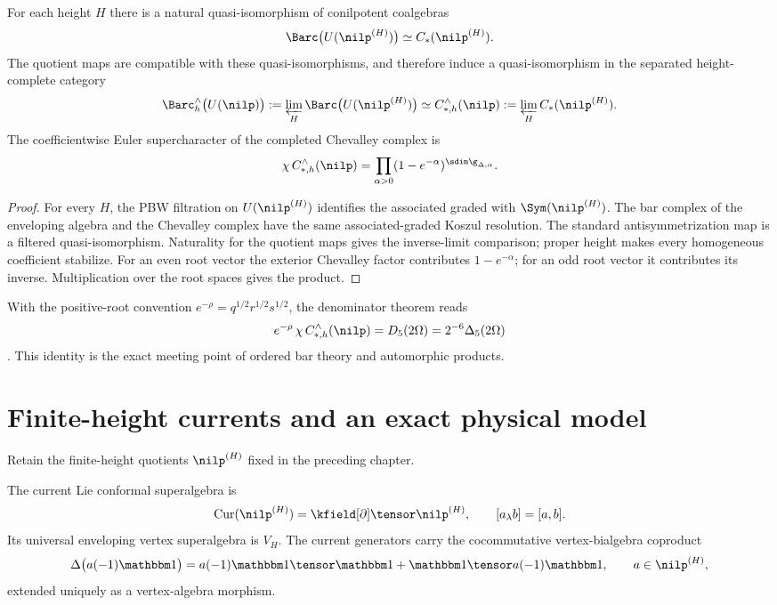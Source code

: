 \begin{theorem}
For each height $H$ there is a natural quasi-isomorphism of conilpotent coalgebras
\[
 \Barc\bigl(U(\nilp^{(H)})\bigr)\simeq C_*(\nilp^{(H)}).
\]
The quotient maps are compatible with these quasi-isomorphisms, and therefore induce a quasi-isomorphism in the separated height-complete category
\[
 \Barc_h^\wedge\bigl(U(\nilp)\bigr):=\varprojlim_H\Barc\bigl(U(\nilp^{(H)})\bigr)
 \simeq
 C_{*,h}^\wedge(\nilp):=\varprojlim_H C_*(\nilp^{(H)}).
\]
The coefficientwise Euler supercharacter of the completed Chevalley complex is
\[
 \chi\,C_{*,h}^\wedge(\nilp)
 =\prod_{\alpha>0}(1-e^{-\alpha})^{\sdim\g_{\Delta,\alpha}}.
\]
\end{theorem}
\begin{proof}
For every $H$, the PBW filtration on $U(\nilp^{(H)})$ identifies the associated graded with $\Sym(\nilp^{(H)})$. The bar complex of the enveloping algebra and the Chevalley complex have the same associated-graded Koszul resolution. The standard antisymmetrization map is a filtered quasi-isomorphism. Naturality for the quotient maps gives the inverse-limit comparison; proper height makes every homogeneous coefficient stabilize. For an even root vector the exterior Chevalley factor contributes $1-e^{-\alpha}$; for an odd root vector it contributes its inverse. Multiplication over the root spaces gives the product.
\end{proof}

With the positive-root convention $e^{-\rho}=q^{1/2}r^{1/2}s^{1/2}$, the denominator theorem reads
\[
 e^{-\rho}\,\chi\,C_{*,h}^\wedge(\nilp)=D_5(2\Omega)=2^{-6}\Delta_5(2\Omega)
\]
\cite{GN97,GN98b}. This identity is the exact meeting point of ordered bar theory and automorphic products.

\chapter{Finite-height currents and an exact physical model}
Retain the finite-height quotients $\nilp^{(H)}$ fixed in the preceding chapter.

The current Lie conformal superalgebra is
\[
 \operatorname{Cur}(\nilp^{(H)})=\kfield[\partial]\tensor\nilp^{(H)},
 \qquad [a_\lambda b]=[a,b].
\]
Its universal enveloping vertex superalgebra is $V_H$. The current generators carry the cocommutative vertex-bialgebra coproduct
\[
 \Delta\bigl(a(-1)\mathbbm1\bigr)
 =a(-1)\mathbbm1\tensor\mathbbm1
 +\mathbbm1\tensor a(-1)\mathbbm1,
 \qquad a\in\nilp^{(H)},
\]
extended uniquely as a vertex-algebra morphism.

